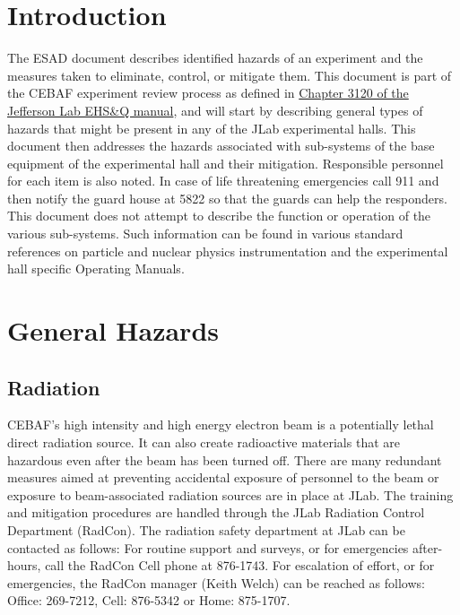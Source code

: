 
%
%

\chapter{Introduction}

The ESAD document describes identified hazards of an experiment and the measures taken to eliminate, control, or mitigate them.
This document is part of the CEBAF experiment review process as defined in
\href{http://www.jlab.org/ehs/ehsmanual/manual/3120.html}{Chapter 3120 of the Jefferson Lab EHS\&Q manual},
and will start by describing general types of hazards that might be present in any of the  
JLab experimental halls.  This document then addresses the hazards associated 
with sub-systems of the base equipment of the experimental hall and their 
mitigation.  Responsible personnel for each item is also noted.  
In case of life threatening 
emergencies call 911 and then notify the guard house at 5822 so that the guards can help
the responders.  This document does not attempt to describe the function 
or operation of the various sub-systems. Such information can be found in various 
standard references on particle and nuclear physics instrumentation and the 
experimental hall specific Operating Manuals.


\chapter{General Hazards}

\section{Radiation}
	
CEBAF's high intensity and high energy electron beam is a potentially lethal direct radiation source. 
It can also create radioactive materials that are hazardous even  after the beam has been turned off. 
There are many redundant measures aimed at preventing accidental exposure of personnel to the beam 
or exposure to beam-associated radiation sources are in place at JLab. The training and mitigation 
procedures are handled through the JLab Radiation Control Department (RadCon). The radiation safety 
department at JLab can be contacted as follows: For routine support and surveys, or for emergencies 
after-hours, call the RadCon Cell phone at 876-1743. For escalation of effort, or for emergencies, 
the RadCon manager (Keith Welch) can be reached as follows: Office: 269-7212, Cell: 876-5342 or Home:  875-1707.


